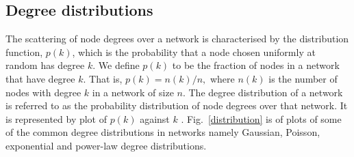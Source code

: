 \documentclass[10pt,a4paper]{article}
\theoremstyle{plain}
\theoremstyle{definition}
\newtheorem{exa}[subsection]{Example}
\begin{document}
\subsection{Degree distributions}
The scattering of node degrees over a network is characterised by the distribution function, $p(k)$, which is the probability that a node chosen uniformly at random has degree $k$. We define $p(k)$ to be the fraction of nodes in a network that have degree $k$. That is, $p(k) = n(k)/n,$ where $n(k)$ is the number of nodes with degree $k$ in a network of size $n$. The degree distribution of a network is  referred to as the probability distribution of node degrees over that network. It is represented by plot of $p(k)$ against $k$ \citep{estrada2011structure}. Fig.~\ref{distribution} is of plots of some of the common degree distributions in networks namely Gaussian, Poisson, exponential and power-law degree distributions.

%	
%
\end{document}
